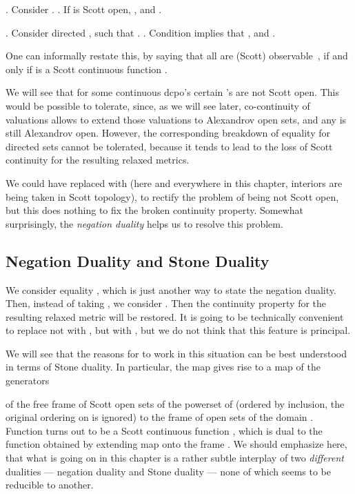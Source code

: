 \Proof
. Consider . 
.
If  is Scott open, ,
and .

. Consider directed , such that .
.
Condition  implies
that , and
.
\eproof

One can informally restate this, by saying that all  are
(Scott) observable~\cite{Smyth}, if and only if  is a Scott
continuous function .

We will see that for some continuous dcpo's certain 's are not
Scott open. This would be possible to tolerate, since, as we will see
later, co-continuity of valuations allows to extend those valuations to
Alexandrov open sets, and any  is still Alexandrov open.
However, the corresponding breakdown of equality
 for directed sets 
cannot be tolerated, because it tends to lead to the loss of
Scott continuity for the resulting relaxed metrics.

We could have replaced  with  (here and everywhere
in this chapter, interiors are being taken in Scott topology),
to rectify the problem of  being not Scott open, but this
does nothing to fix the broken continuity property.
Somewhat surprisingly, the {\em negation duality} helps us to
resolve this problem. 

\subsection{Negation Duality and Stone Duality}

We consider equality , which is just another way to state the
negation duality. Then, instead of taking ,
we consider .
Then the continuity property for the
resulting relaxed metric will be restored.
It is going to be technically convenient to replace 
not with , but with , but we do not think that this
feature is principal.

We will see that the reasons for  to work in this situation
can be best understood in terms of Stone duality.
In particular,
the map  gives rise to a map of the generators

of the free frame of Scott open sets of the powerset of  (ordered by
inclusion, the original ordering on  is ignored) to the frame
of open sets of the domain . 
Function  turns out to be a Scott continuous function
, which is dual to the function
 obtained by extending
map  onto the frame
.
We should emphasize here, that
what is going on in this chapter is a rather subtle interplay of
two {\em different} dualities --- negation duality and Stone duality ---
none of which seems to be reducible to another.

